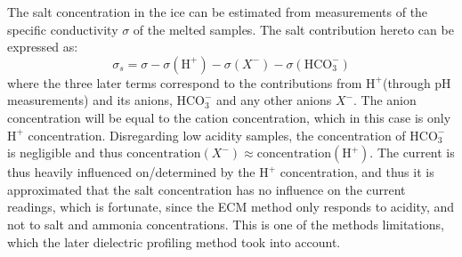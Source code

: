 \documentclass[../../CompleteThesis/Complete_1stDraft.tex]{subfiles}
\begin{document}
The salt concentration in the ice can be estimated from measurements of the specific conductivity $\sigma$ of the melted samples. The salt contribution hereto can be expressed as:
\begin{equation}
	\sigma_s = \sigma - \sigma(\text{H}^+) - \sigma(X^-) - \sigma(\text{HCO}_3^-)
\end{equation}
where the three later terms correspond to the contributions from $\text{H}^+$(through pH measurements) and its anions\footnotemark, $\text{HCO}_3^-$ and any other anions $X^-$. The anion concentration will be equal to the cation concentration, which in this case is only $\text{H}^+$ concentration. Disregarding low acidity samples, the concentration of $\text{HCO}_3^-$ is negligible and thus  $\text{concentration}(X^-) \approx \text{concentration}(\text{H}^+)$. 
The current is thus heavily influenced on/determined by the $\text{H}^+$ concentration, and thus it is approximated that the salt concentration has no influence on the current readings, which is fortunate, since the ECM method only responds to acidity, and not to salt and ammonia concentrations. This is one of the methods limitations, which the later dielectric profiling method took into account.

\end{document}
